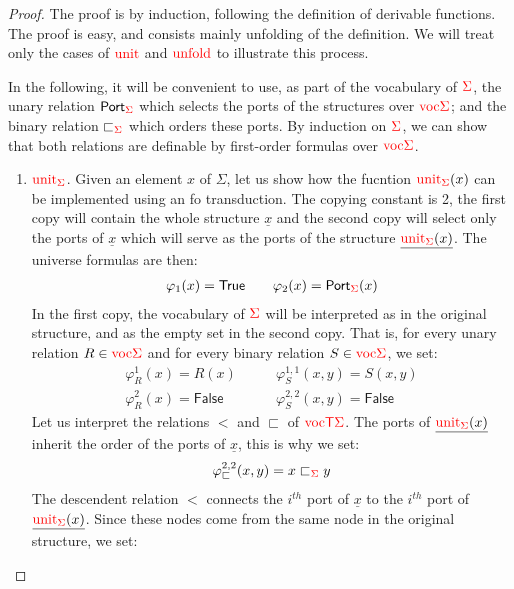     \begin{proof}
    The proof is by induction, following the definition of derivable functions. The proof is easy, and consists mainly unfolding of the definition. We will treat only the cases of ${\color{red}{\mathrm{unit}}}$ and ${\color{red}{\mathrm{unfold}}}$ to illustrate this process.
    
    In the following, it will be convenient to use, as part of the vocabulary of ${\color{red}{\Sigma}}$, the unary relation  $\mathsf{Port}_{\color{red}{\Sigma}}$ which selects the ports of the structures over ${\color{red}{\mathrm{voc}}}{\color{red}{\Sigma}}$; and the binary relation $\sqsubset_{\color{red}{\Sigma}}$ which orders these ports. By induction on ${\color{red}{\Sigma}}$, we can show that both relations are definable by first-order formulas over  ${\color{red}{\mathrm{voc}}}{\color{red}{\Sigma}}$.
    
    \begin{enumerate}
    \item ${\color{red}{\mathrm{unit}}}_{\color{red}{\Sigma}}$. Given an element $x$ of $\Sigma$, let us show how the fucntion ${\color{red}{\mathrm{unit}}}_{\color{red}{\Sigma}}(x)$ can be implemented using an fo transduction.  The copying constant is 2,
    the first copy will contain the whole structure $\underline{x}$ and the second copy will select only the ports of $\underline{x}$ which will serve as the ports of the structure $\underline{{\color{red}{\mathrm{unit}}}_{\color{red}{\Sigma}}(x)}$.  The universe formulas are then:
    \begin{align*}
    \varphi_1(x)=\mathsf{True} \qquad \varphi_2(x)=\mathsf{Port}_{\color{red}{\Sigma}}(x)
    \end{align*}
    In the first copy, the vocabulary of ${\color{red}{\Sigma}}$ will be interpreted as in the original structure, and as the empty set in the second copy. That is, for every unary relation $R\in {\color{red}{\mathrm{voc}}}{\color{red}{\Sigma}}$ and for every binary relation $S \in {\color{red}{\mathrm{voc}}}{\color{red}{\Sigma}}$, we set:
    \begin{align*}
   \varphi_R^{1}(x)=R(x) \quad&\quad \varphi_S^{1,1}(x,y)=S(x,y)\\
   \varphi_R^{2}(x)=\mathsf{False} \quad&\quad \varphi_S^{2,2}(x,y)=\mathsf{False}
\end{align*}      
Let us interpret the relations $<$ and $\sqsubset$ of ${\color{red}{\mathrm{voc}}}{\color{red}{\mathsf T}}{\color{red}{\Sigma}}$. The  ports of $\underline{{\color{red}{\mathrm{unit}}}_{\color{red}{\Sigma}}(x)}$ inherit the order of the ports of $\underline{x}$, this is why we set:
\begin{align*}
\varphi_\sqsubset^{2,2}(x,y)=x\sqsubset_{\color{red}{\Sigma}} y
\end{align*}
The descendent relation $<$ connects the $i^{th}$ port of $\underline{x}$ to the $i^{th}$ port of $\underline{{\color{red}{\mathrm{unit}}}_{\color{red}{\Sigma}}(x)}$. Since these nodes come from the same node in the original structure, we set:

\end{enumerate}
\end{proof}
